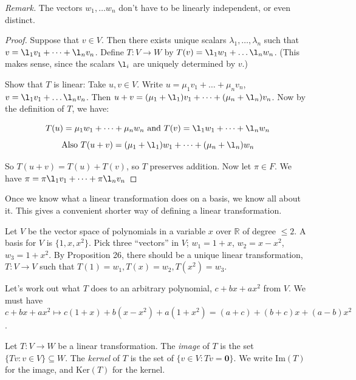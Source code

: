 \documentclass[10pt]{scrartcl}
\begin{document}
\textit{Remark.} The vectors $w_1, \dots w_n$ don't have to be linearly independent, or even distinct.
\begin{proof}
Suppose that $v \in V.$ Then there exists unique scalars $\lambda_1,\dots,\lambda_n$ such that $v = \l_1v_1 + \dots + \l_nv_n$. Define $T: V \to W$ by $T(v) = \l_1w_1 + \dots \l_nw_n$. (This makes sense, since the scalars $\l_i$ are uniquely determined by $v$.)

Show that $T$ is linear: Take $u,v \in V$. Write $u = \mu_1v_1 + \dots + \mu_nv_n$, $v = \l_1v_1 + \dots \l_nv_n$. Then $u+v = (\mu_1 + \l_1)v_1 + \dots + (\mu_n + \l_n)v_n$. Now by the definition of $T$, we have:

\[T(u) = \mu_1w_1 + \dots + \mu_nw_n \text{ and }T(v) = \l_1w_1 + \dots + \l_nw_n\]
\[\text{Also }T(u+v) = (\mu_1 + \l_1)w_1 + \dots + (\mu_n + \l_n)w_n\]

So $T(u+v) = T(u) + T(v)$, so $T$ preserves addition. Now let $\pi \in F$. We have $\pi = \pi\l_1v_1 + \dots + \pi\l_nv_n$
\end{proof}\vspace*{5pt}

\begin{remark} Once we know what a linear transformation does on a basis, we know all about it. This gives a convenient shorter way of defining a linear transformation. 	
\end{remark}\vspace*{5pt}


\begin{example} Let $V$ be the vector space of polynomials in a variable $x$ over $\mathbb{R}$ of degree $\leq 2$. A basis for $V$ is $\{1,x,x^2\}$.
Pick three ``vectors'' in $V$; $w_1 = 1+x$, $w_2 = x-x^2$, $w_3 = 1+x^2$. By Proposition 26, there should be a unique linear transformation, $T: V\to V$ such that $T(1) = w_1, T(x) = w_2, T(x^2) = w_3$.

Let's work out what $T$ does to an arbitrary polynomial, $c + bx + ax^2$ from $V$. We must have $c + bx + ax^2 \longmapsto c(1+x) + b(x-x^2) + a(1+x^2) = (a+c) + (b+c)x + (a-b)x^2$.
\end{example}

  
 
\begin{definition}   
 Let $T: V \to W$ be a linear transformation. The \emph{image} of $T$ is the set $\{Tv : v\in V\} \subseteq W$. The \emph{kernel} of $T$ is the set of $\{ v \in V: Tv = \mathbf{0} \}$. We write Im$(T)$ for the image, and Ker$(T)$ for the kernel. 
 \end{definition}
\end{document}
